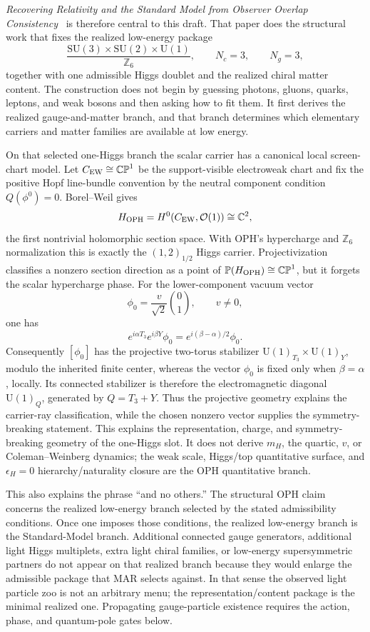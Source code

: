 \documentclass[11pt]{article}
\newcommand{\SU}{\mathrm{SU}}
\newcommand{\U}{\mathrm{U}}
\begin{document}
\emph{Recovering Relativity and the Standard Model from Observer Overlap Consistency}~\cite{ophcompact} is therefore central to this draft. That paper does
the structural work that fixes the realized low-energy package
\[
\frac{\SU(3)\times\SU(2)\times\U(1)}{\mathbb Z_6},
\qquad
N_c=3,
\qquad
N_g=3,
\]
together with one admissible Higgs doublet and the realized chiral matter content. The
construction does not begin by guessing photons, gluons, quarks, leptons, and weak bosons and
then asking how to fit them. It first derives the realized gauge-and-matter branch, and that
branch determines which elementary carriers and matter families are available at low energy.

On that selected one-Higgs branch the scalar carrier has a canonical local screen-chart model.
Let \(C_{\rm EW}\cong\mathbb{CP}^1\) be the support-visible electroweak chart and fix the positive
Hopf line-bundle convention by the neutral component condition \(Q(\phi^0)=0\). Borel--Weil gives
\[
H_{\rm OPH}=H^0(C_{\rm EW},\mathcal O(1))\cong\mathbb C^2,
\]
the first nontrivial holomorphic section space. With OPH's hypercharge and \(\mathbb Z_6\)
normalization this is exactly the \((1,2)_{1/2}\) Higgs carrier. Projectivization classifies a
nonzero section direction as a point of \(\mathbb P(H_{\rm OPH})\cong\mathbb{CP}^1\), but it
forgets the scalar hypercharge phase. For the lower-component vacuum vector
\[
\phi_0=\frac{v}{\sqrt2}\binom{0}{1},\qquad v\ne0,
\]
one has
\[
e^{i\alpha T_3}e^{i\beta Y}\phi_0
=e^{i(\beta-\alpha)/2}\phi_0.
\]
Consequently \([\phi_0]\) has the projective two-torus stabilizer
\(\U(1)_{T_3}\times\U(1)_Y\), modulo the inherited finite center, whereas the vector
\(\phi_0\) is fixed only when \(\beta=\alpha\), locally. Its connected stabilizer is therefore the
electromagnetic diagonal \(\U(1)_Q\), generated by \(Q=T_3+Y\). Thus the projective geometry
explains the carrier-ray classification, while the chosen nonzero vector supplies the
symmetry-breaking statement. This explains the representation, charge, and symmetry-breaking
geometry of the one-Higgs slot. It does not derive \(m_H\), the quartic, \(v\), or
Coleman--Weinberg dynamics; the
weak scale, Higgs/top quantitative surface, and \(\epsilon_H=0\) hierarchy/naturality closure are
the OPH quantitative branch.

This also explains the phrase ``and no others.'' The structural OPH claim concerns the realized
low-energy branch selected by the stated admissibility conditions. Once one imposes those
conditions, the realized low-energy branch is the
Standard-Model branch. Additional connected gauge generators,
additional light Higgs multiplets, extra light chiral families, or low-energy supersymmetric
partners do not appear on that realized branch because they would enlarge the admissible package
that MAR selects against. In that sense the observed light particle zoo is not an arbitrary menu;
the representation/content package is the minimal realized one. Propagating gauge-particle
existence requires the action, phase, and quantum-pole gates below.
\end{document}
